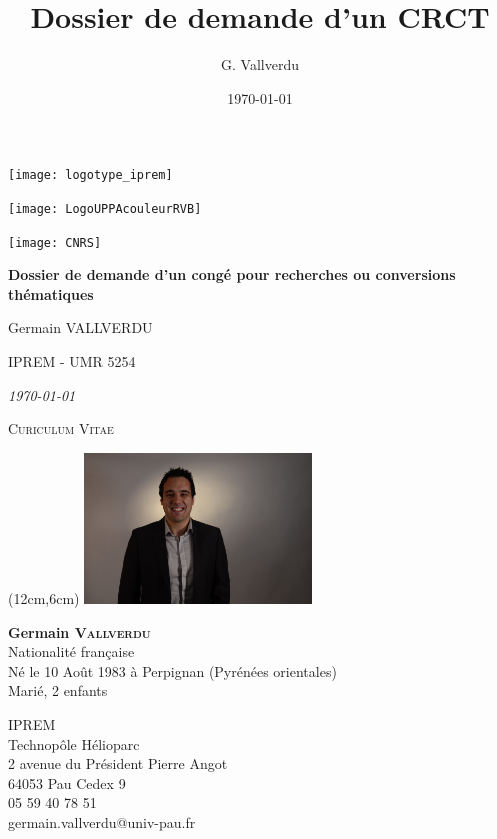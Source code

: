 \documentclass[11pt]{artuppax}
\title{Dossier de demande d'un CRCT}
\author{G. Vallverdu}
\date{\today}
\renewcommand{\maketitle}{%
    \thispagestyle{titlepage}
    \singlespacing
    \begin{center}
        \parbox{.33\textwidth}{\texttt{[image: logotype\_iprem]}}
        \parbox{.33\textwidth}{\centering \texttt{[image: LogoUPPAcouleurRVB]}}
        \parbox{.33\textwidth}{\hfill\texttt{[image: CNRS]}}

        \vspace*{\stretch{1}}

        {\Huge\bfseries\setlength{\baselineskip}{1.2\baselineskip}%
        Dossier de demande d'un congé pour recherches ou conversions thématiques
        \par}

        \vspace{4ex}

        {\LARGE Germain VALLVERDU}

        {\Large IPREM - UMR 5254}

        {\Large\itshape\today}

    \end{center}
    \vspace*{\stretch{1}}
    }
\begin{document}
%
%

\maketitle

\newpage
\setcounter{tocdepth}{1}
\tableofcontents

\newpage




\begin{center}
    \LARGE
    \textsc{Curiculum Vitae}
\end{center}
\vspace*{10mm}

	\begin{textblock*}{60mm}(12cm,6cm)
	    \includegraphics[height=4cm]{gvallver}
	\end{textblock*}


\textbf{\large Germain \textsc{Vallverdu}} \\
Nationalité française \\
Né le 10 Août 1983 à Perpignan (Pyrénées orientales) \\
Marié, 2 enfants


\faEnvelope{} IPREM\\
Technopôle Hélioparc\\
2 avenue du Président Pierre Angot\\
64053 Pau Cedex 9\\
\faPhone{} 05 59 40 78 51\\
\faAt{} germain.vallverdu@univ-pau.fr \par
\end{document}
